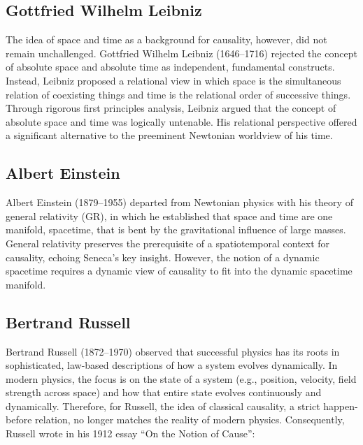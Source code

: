 \subsection{Gottfried Wilhelm Leibniz}
\label{sec:history_leibniz}

The idea of space and time as a background for causality, however, did not remain unchallenged. Gottfried Wilhelm Leibniz (1646--1716) rejected the concept of absolute space and absolute time as independent, fundamental constructs. Instead, Leibniz proposed\cite{LeibnizPhysicsSEP} a relational view in which space is the simultaneous relation of coexisting things and time is the relational order of successive things.
Through rigorous first principles analysis, Leibniz argued that the concept of absolute space and time was logically untenable.
His relational perspective offered a significant alternative to the preeminent Newtonian worldview of his time.

\subsection{Albert Einstein}
\label{sec:history_einstein}

Albert Einstein (1879--1955) departed from Newtonian physics with his theory of general relativity\cite{EinsteinPapers1915} (GR), in which he established that space and time are one manifold, spacetime, that is bent by the gravitational influence of large masses. General relativity preserves the prerequisite of a spatiotemporal context for causality, echoing Seneca's key insight. However, the notion of a dynamic spacetime requires a dynamic view of causality to fit into the dynamic spacetime manifold.

\subsection{Bertrand Russell}
\label{sec:history_Russell}

Bertrand Russell (1872--1970) observed that successful physics has its roots in sophisticated, law-based descriptions of how a system evolves dynamically. In modern physics, the focus is on the state of a system (e.g., position, velocity, field strength across space) and how that entire state evolves continuously and dynamically. Therefore, for Russell, the idea of classical causality, a strict happen-before relation, no longer matches the reality of modern physics. Consequently, Russell wrote in his 1912 essay ``On the Notion of Cause''\cite{RussellOnCause}:



